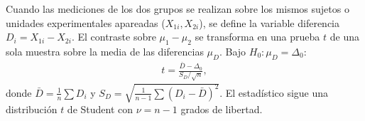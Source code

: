 \begin{definicion}
	Cuando las mediciones de los dos grupos se realizan sobre los mismos sujetos o unidades experimentales apareadas ($X_{1i}, X_{2i}$), se define la variable diferencia $D_i = X_{1i} - X_{2i}$. El contraste sobre $\mu_1 - \mu_2$ se transforma en una prueba $t$ de una sola muestra sobre la media de las diferencias $\mu_D$. Bajo $H_0: \mu_D = \Delta_0$:
	\begin{align}
		t = \frac{\bar{D} - \Delta_0}{S_D / \sqrt{n}},
	\end{align}
	donde $\bar{D} = \frac{1}{n}\sum D_i$ y $S_D = \sqrt{\frac{1}{n-1}\sum (D_i - \bar{D})^2}$. El estadístico sigue una distribución $t$ de Student con $\nu = n - 1$ grados de libertad.
\end{definicion}

